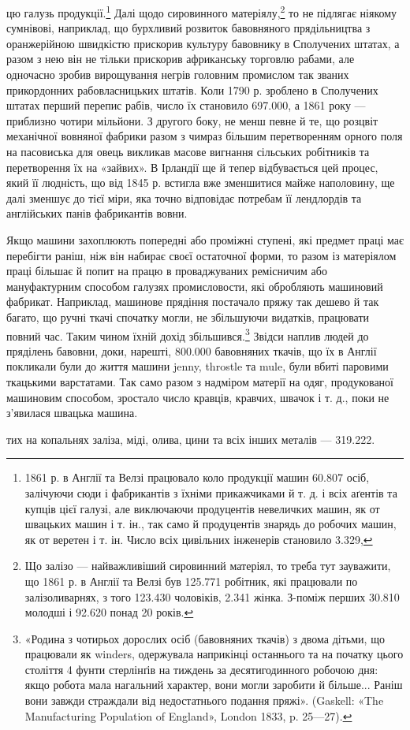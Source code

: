 цю галузь продукції.\footnote{
1861 р. в Англії та Велзі працювало коло продукції машин 60.807
осіб, залічуючи сюди і фабрикантів з їхніми прикажчиками й т. д. і всіх
аґентів та купців цієї галузі, але виключаючи продуцентів невеличких
машин, як от швацьких машин і т. ін., так само й продуцентів знарядь
до робочих машин, як от веретен і т. ін. Число всіх цивільних інженерів
становило 3.329,
} Далі щодо сировинного матеріялу,\footnote{
Що залізо — найважливіший сировинний матеріял, то треба тут
зауважити, що 1861 р. в Англії та Велзі був 125.771 робітник, які
працювали по залізоливарнях, з того 123.430 чоловіків, 2.341 жінка.
З-поміж перших 30.810 молодші і 92.620 понад 20 років.
} то
не підлягає ніякому сумнівові, наприклад, що бурхливий розвиток
бавовняного прядільництва з оранжерійною швидкістю прискорив
культуру бавовнику в Сполучених штатах, а разом з нею
він не тільки прискорив африканську торговлю рабами, але
одночасно зробив вирощування негрів головним промислом так
званих прикордонних рабовласницьких штатів. Коли 1790 р.
зроблено в Сполучених штатах перший перепис рабів, число їх
становило 697.000, а 1861 року — приблизно чотири мільйони.
З другого боку, не менш певне й те, що розцвіт механічної вовняної
фабрики разом з чимраз більшим перетворенням орного поля на
пасовиська для овець викликав масове вигнання сільських робітників
та перетворення їх на «зайвих». В Ірландії ще й тепер
відбувається цей процес, який її людність, що від 1845 р. встигла
вже зменшитися майже наполовину, ще далі зменшує до тієї
міри, яка точно відповідає потребам її лендлордів та англійських
панів фабрикантів вовни.

Якщо машини захоплюють попередні або проміжні ступені,
які предмет праці має перебігти раніш, ніж він набирає своєї
остаточної форми, то разом із матеріялом праці більшає й попит
на працю в проваджуваних ремісничим або мануфактурним способом
галузях промисловости, які обробляють машиновий
фабрикат. Наприклад, машинове прядіння постачало пряжу так
дешево й так багато, що ручні ткачі спочатку могли, не збільшуючи
видатків, працювати повний час. Таким чином їхній дохід
збільшився.\footnote{
«Родина з чотирьох дорослих осіб (бавовняних ткачів) з двома
дітьми, що працювали як winders, одержувала наприкінці останнього та
на початку цього століття 4 фунти стерлінґів на тиждень за десятигодинного
робочою дня: якщо робота мала нагальний характер, вони могли
заробити й більше... Раніш вони завжди страждали від недостатнього
подання пряжі». (Gaskell: «The Manufacturing Population of England»,
London 1833, p. 25—27).
} Звідси наплив людей до пряділень бавовни,
доки, нарешті, 800.000 бавовняних ткачів, що їх в Англії покликали
були до життя машини jenny, throstle та mule, були
вбиті паровими ткацькими варстатами. Так само разом з надміром
матерії на одяг, продукованої машиновим способом, зростало
число кравців, кравчих, швачок і т. д., поки не з’явилася
швацька машина.

тих на копальнях заліза, міді, олива, цини та всіх інших металів —
319.222.